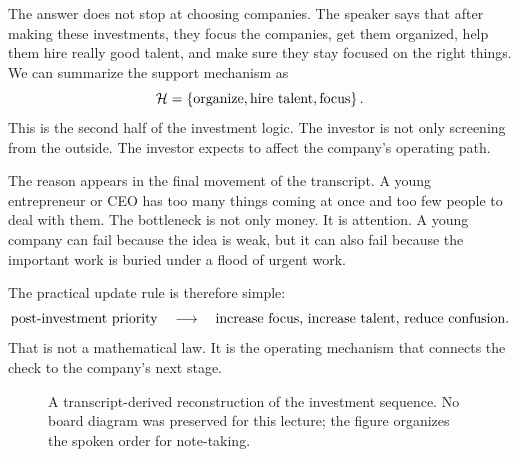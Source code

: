 The answer does not stop at choosing companies. The speaker says that after making these investments, they focus the companies, get them organized, help them hire really good talent, and make sure they stay focused on the right things. We can summarize the support mechanism as
\begin{equation}
\mathcal{H}
=
\left\{
\hbox{organize},
\hbox{hire talent},
\hbox{focus}
\right\}.
\end{equation}
This is the second half of the investment logic. The investor is not only screening from the outside. The investor expects to affect the company's operating path.

The reason appears in the final movement of the transcript. A young entrepreneur or CEO has too many things coming at once and too few people to deal with them. The bottleneck is not only money. It is attention. A young company can fail because the idea is weak, but it can also fail because the important work is buried under a flood of urgent work.

The practical update rule is therefore simple:
\begin{equation}
\hbox{post-investment priority}
\quad \longrightarrow \quad
\hbox{increase focus, increase talent, reduce confusion}.
\end{equation}
That is not a mathematical law. It is the operating mechanism that connects the check to the company's next stage.

\begin{figure}
\centering
{}
\caption{A transcript-derived reconstruction of the investment sequence. No board diagram was preserved for this lecture; the figure organizes the spoken order for note-taking.}
\end{figure}

